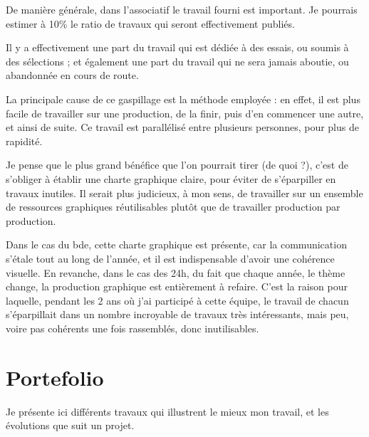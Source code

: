     De manière générale, dans l'associatif le travail fourni est important. Je pourrais estimer à 10\% le ratio de travaux qui seront effectivement publiés.

    Il y a effectivement une part du travail qui est dédiée à des essais, ou soumis à des sélections ; et également une part du travail qui ne sera jamais aboutie, ou abandonnée en cours de route.

    La principale cause de ce gaspillage est la méthode employée : en effet, il est plus facile de travailler sur une production, de la finir, puis d'en commencer une autre, et ainsi de suite. Ce travail est parallélisé entre plusieurs personnes, pour plus de rapidité.

    Je pense que le plus grand bénéfice que l'on pourrait tirer (de quoi ?), c'est de s'obliger à établir une charte graphique claire, pour éviter de s'éparpiller en travaux inutiles.
    Il serait plus judicieux, à mon sens, de travailler sur un ensemble de ressources graphiques réutilisables plutôt que de travailler production par production.

    Dans le cas du bde, cette charte graphique est présente, car la communication s'étale tout au long de l'année, et il est indispensable d'avoir une cohérence visuelle.
    En revanche, dans le cas des 24h, du fait que chaque année, le thème change, la production graphique est entièrement à refaire.
    C'est la raison pour laquelle, pendant les 2 ans où j'ai participé à cette équipe, le travail de chacun s'éparpillait dans un nombre incroyable de travaux très intéressants, mais peu, voire pas cohérents une fois rassemblés, donc inutilisables.

\newpage

\section{Portefolio}

    Je présente ici différents travaux qui illustrent le mieux mon travail, et les évolutions que suit un projet.

